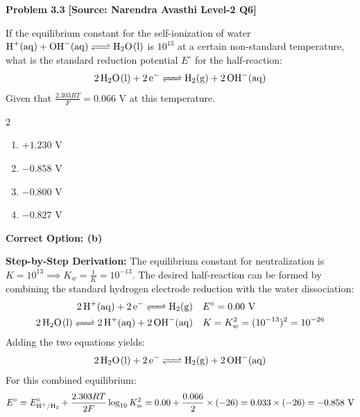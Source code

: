 \begin{problembox}
\textbf{Problem 3.3} \hfill \textbf{[Source: Narendra Avasthi Level-2 Q6]}

If the equilibrium constant for the self-ionization of water $\ce{H+(aq) + OH-(aq) <=> H2O(l)}$ is $10^{13}$ at a certain non-standard temperature, what is the standard reduction potential $E^\circ$ for the half-reaction:
\begin{equation*}
    \ce{2H2O(l) + 2e^- <=> H2(g) + 2OH-(aq)}
\end{equation*}
Given that $\frac{2.303 RT}{F} = 0.066\text{ V}$ at this temperature.
\begin{multicols}{2}
\begin{enumerate}[label=(\alph*)]
    \item $+1.230\text{ V}$
    \item $-0.858\text{ V}$
    \item $-0.800\text{ V}$
    \item $-0.827\text{ V}$
\end{enumerate}
\end{multicols}
\end{problembox}
\begin{solution}
\textbf{Correct Option: (b)}

\textbf{Step-by-Step Derivation:}
The equilibrium constant for neutralization is $K = 10^{13} \implies K_w = \frac{1}{K} = 10^{-13}$.
The desired half-reaction can be formed by combining the standard hydrogen electrode reduction with the water dissociation:
\begin{align*}
    \ce{2H+(aq) + 2e^- <=> H2(g)} \quad & E^\circ = 0.00\text{ V} \\
    \ce{2H2O(l) <=> 2H+(aq) + 2OH-(aq)} \quad & K = K_w^2 = (10^{-13})^2 = 10^{-26}
\end{align*}
Adding the two equations yields:
\begin{equation*}
    \ce{2H2O(l) + 2e^- <=> H2(g) + 2OH-(aq)}
\end{equation*}
For this combined equilibrium:
\begin{equation*}
    E^\circ = E^\circ_{\ce{H+/H2}} + \frac{2.303 RT}{2F} \log_{10} K_w^2 = 0.00 + \frac{0.066}{2} \times (-26) = 0.033 \times (-26) = -0.858\text{ V}
\end{equation*}
\end{solution}

